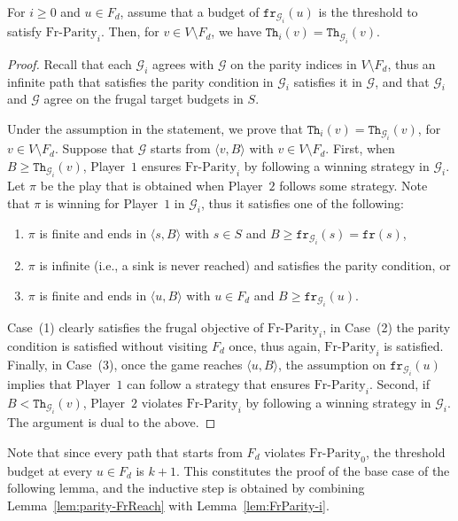 \documentclass{theoretics}
\newcommand{\PO}{Player~$1$\xspace}
\newcommand{\PT}{Player~$2$\xspace}
\newcommand{\G}{{\mathcal G}}
\newcommand{\fr}{\texttt{fr}}
\newcommand{\notFd}{V \setminus F_d}
\newcommand{\thresh}{\texttt{Th}\xspace}
\newcommand{\frparity}{\text{Fr-Parity}}
\newcommand{\zug}[1]{\langle #1  \rangle}
\begin{document}
\begin{lemma}
	\label{lem:FrParity-i}
	For \(i \geq 0\) and \(u \in F_d\), assume that a budget of \(\fr_{\G_i}(u)\) is the threshold to satisfy \(\frparity_{i}\). Then, for \(v \in \notFd\), we have \(\thresh_i(v) = \thresh_{\G_i}(v)\). 
\end{lemma}



\begin{proof}
	Recall that each $\G_i$ agrees with $\G$ on the parity indices in $\notFd$, thus an infinite path that satisfies the parity condition in $\G_i$ satisfies it in $\G$, and that $\G_i$ and $\G$ agree on the frugal target budgets in $S$. 
	
	Under the assumption in the statement, we prove that $\thresh_{i}(v) = \thresh_{\G_i}(v)$, for $v \in \notFd$. 
	Suppose that $\G$ starts from $\zug{v, B}$ with $v \in \notFd$. First, when $B \geq \thresh_{\G_i}(v)$, \PO ensures $\frparity_i$ by following a winning strategy in $\G_i$. Let $\pi$ be the play that is obtained when \PT follows some strategy. Note that $\pi$ is winning for \PO in $\G_i$, thus it satisfies one of the following: 
	\begin{enumerate}
		\item $\pi$ is finite and ends in $\zug{s, B}$ with $s \in S$ and $B \geq \fr_{\G_i}(s) = \fr(s)$, 
		\item $\pi$ is infinite (i.e., a sink is never reached) and satisfies the parity condition,  or 
		\item $\pi$ is finite and ends in $\zug{u, B}$ with $u \in F_d$ and $B \geq \fr_{\G_i}(u)$. 
	\end{enumerate} 
	Case~(1) clearly satisfies the frugal objective of $\frparity_i$, in Case~(2) the parity condition is satisfied without visiting $F_d$ once, thus again, $\frparity_i$ is satisfied. 
	Finally, in Case~(3), once the game reaches $\zug{u, B}$, the assumption on \(\fr_{\G_i}(u)\) implies that \PO can follow a strategy that ensures \(\frparity_{i}\). 
	Second, if $B < \thresh_{\G_i}(v)$, \PT violates $\frparity_i$ by following a winning strategy in $\G_i$. The argument is dual to the above. 
\end{proof}


Note that since every path that starts from $F_d$ violates $\frparity_0$, the threshold budget at every $u \in F_d$ is $k+1$. This constitutes the proof of the base case of the following lemma, and the inductive step is obtained by combining Lemma~\ref{lem:parity-FrReach} with Lemma~\ref{lem:FrParity-i}.
\end{document}
